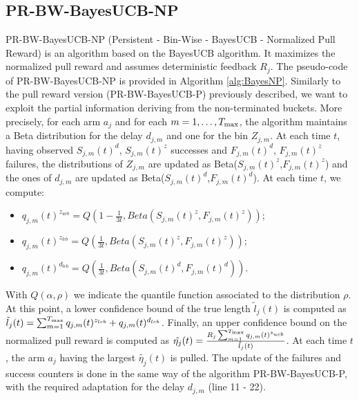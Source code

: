 \subsection{PR-BW-BayesUCB-NP}
PR-BW-BayesUCB-NP (Persistent - Bin-Wise - BayesUCB - Normalized Pull Reward) is an algorithm based on the BayesUCB algorithm. It maximizes the normalized pull reward and assumes deterministic feedback $R_j$. The pseudo-code of PR-BW-BayesUCB-NP is provided in Algorithm \ref{alg:BayesNP}. Similarly to the pull reward version (PR-BW-BayesUCB-P) previously described, we want to exploit the partial information deriving from the non-terminated buckets. More precisely, for each arm $a_j$ and for each $m=1,\dots,T_{\textnormal{max}}$, the algorithm maintains a Beta distribution for the delay $d_{j,m}$ and one for the bin $Z_{j,m}$. At each time $t$, having observed $S_{j,m}(t)^{d}$, $S_{j,m}(t)^{z}$ successes and $F_{j,m}(t)^d$, $F_{j,m}(t)^z$ failures, the distributions of $Z_{j,m}$ are updated as Beta($S_{j,m}(t)^z$,$F_{j,m}(t)^z$) and the ones of $d_{j,m}$ are updated as Beta($S_{j,m}(t)^d$,$F_{j,m}(t)^d$). At each time $t$, we compute:
\begin{itemize}
	\item $q_{j,m}(t)^{z_{ucb}} = Q(1-\frac{1}{3t},Beta(S_{j,m}(t)^z,F_{j,m}(t)^z))$;
	\item $q_{j,m}(t)^{z_{lcb}} = Q(\frac{1}{3t},Beta(S_{j,m}(t)^z,F_{j,m}(t)^z))$;
	\item $q_{j,m}(t)^{d_{lcb}} = Q(\frac{1}{3t},Beta(S_{j,m}(t)^d,F_{j,m}(t)^d))$. 
\end{itemize}
With $Q(\alpha,\rho)$ we indicate the quantile function associated to the distribution $\rho$. At this point, a lower confidence bound of the true length $\tilde{l}_j(t)$ is computed as $\tilde{l}_j(t)= \sum_{m=1}^{T_{\textnormal{max}}} q_{j,m}(t)^{z_{lcb}} + q_{j,m}(t)^{d_{lcb}}$. Finally, an upper confidence bound on the normalized pull reward is computed as $\tilde{\eta_j}(t) = \frac{R_j\sum_{m=1}^{T_{\textnormal{max}}}q_{j,m}(t)^{z_{ucb}}}{\tilde{l}_j(t)}$. At each time $t$, the arm $a_j$ having the largest $\tilde{\eta_j}(t)$ is pulled. The update of the failures and success counters is done in the same way of the algorithm PR-BW-BayesUCB-P, with the required adaptation for the delay $d_{j,m}$ (line 11 - 22). 


